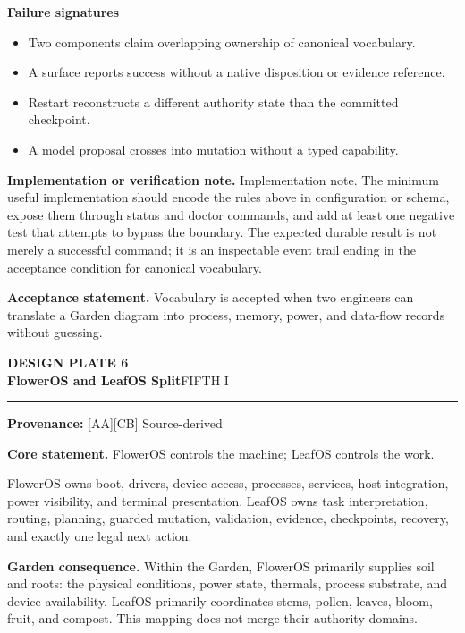 \documentclass[10pt,letterpaper,oneside]{article}
\newcommand{\prov}[1]{\textcolor{gardenBlue}{\sffamily\footnotesize\textbf{Provenance:} #1}}
\newcommand{\platetitle}[3]{%
  \begin{minipage}[t][0.54in][t]{\textwidth}
  {\sffamily\bfseries\color{gardenDeep}\fontsize{9}{10}\selectfont DESIGN PLATE #1}\\[-1pt]
  {\sffamily\bfseries\color{gardenInk}\fontsize{16.5}{18}\selectfont #2}\hfill{\sffamily\color{gardenGreen}\large #3}
  \end{minipage}\vspace{-2pt}\hrule\vspace{5pt}}
\begin{document}
\textbf{Failure signatures}
\begin{itemize}
\item Two components claim overlapping ownership of canonical vocabulary.
\item A surface reports success without a native disposition or evidence reference.
\item Restart reconstructs a different authority state than the committed checkpoint.
\item A model proposal crosses into mutation without a typed capability.
\end{itemize}
\textbf{Implementation or verification note.} Implementation note. The minimum useful implementation should encode the rules above in configuration or schema, expose them through status and doctor commands, and add at least one negative test that attempts to bypass the boundary. The expected durable result is not merely a successful command; it is an inspectable event trail ending in the acceptance condition for canonical vocabulary.

\begin{acceptbox}
\textbf{Acceptance statement.} Vocabulary is accepted when two engineers can translate a Garden diagram into process, memory, power, and data-flow records without guessing.
\end{acceptbox}
\newpage
\platetitle{6}{FlowerOS and LeafOS Split}{FIFTH I}
\prov{[AA][CB] Source-derived}
\fontsize{8.85}{10.45}\selectfont
\begin{corebox}
\textbf{Core statement.} FlowerOS controls the machine; LeafOS controls the work.
\end{corebox}
FlowerOS owns boot, drivers, device access, processes, services, host integration, power visibility, and terminal presentation. LeafOS owns task interpretation, routing, planning, guarded mutation, validation, evidence, checkpoints, recovery, and exactly one legal next action.

\textbf{Garden consequence.} Within the Garden, FlowerOS primarily supplies soil and roots: the physical conditions, power state, thermals, process substrate, and device availability. LeafOS primarily coordinates stems, pollen, leaves, bloom, fruit, and compost. This mapping does not merge their authority domains.
\end{document}
